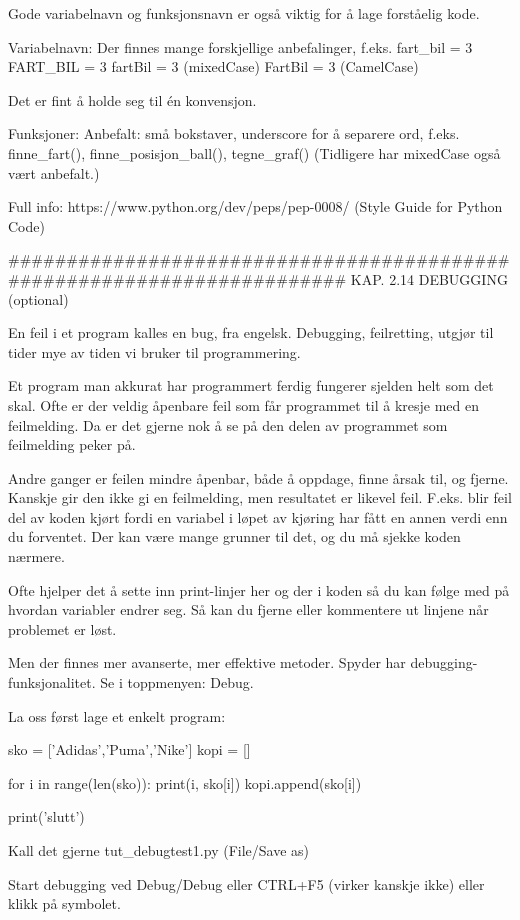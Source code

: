 Gode variabelnavn og funksjonsnavn er også viktig for å lage forståelig kode.

Variabelnavn: 
Der finnes mange forskjellige anbefalinger, f.eks. 
fart_bil = 3
FART_BIL = 3
fartBil = 3 (mixedCase)
FartBil = 3 (CamelCase)

Det er fint å holde seg til én konvensjon. 


Funksjoner:
Anbefalt: små bokstaver, underscore for å separere ord, f.eks.
finne_fart(), finne_posisjon_ball(), tegne_graf()
(Tidligere har mixedCase også vært anbefalt.) 


Full info: https://www.python.org/dev/peps/pep-0008/ (Style Guide for Python Code) 

######################################################################## 
KAP. 2.14  DEBUGGING  (optional)

En feil i et program kalles en bug, fra engelsk. 
Debugging, feilretting, utgjør til tider mye av tiden vi bruker til programmering. 

Et program man akkurat har programmert ferdig fungerer sjelden helt som det skal.
Ofte er der veldig åpenbare feil som får programmet til å kresje med en feilmelding.
Da er det gjerne nok å se på den delen av programmet som feilmelding peker på. 

Andre ganger er feilen mindre åpenbar, både å oppdage, finne årsak til, og fjerne. 
Kanskje gir den ikke gi en feilmelding, men resultatet er likevel feil. 
F.eks. blir feil del av koden kjørt fordi en variabel 
i løpet av kjøring har fått en annen verdi enn du forventet.
Der kan være mange grunner til det, og du må sjekke koden nærmere. 

Ofte hjelper det å sette inn print-linjer her og der i koden så du kan
følge med på hvordan variabler endrer seg. 
Så kan du fjerne eller kommentere ut linjene når problemet er løst.

Men der finnes mer avanserte, mer effektive metoder.  
Spyder har debugging-funksjonalitet.
Se i toppmenyen: Debug.


La oss først lage et enkelt program:

sko = ['Adidas','Puma','Nike']
kopi = []

for i in range(len(sko)): 
    print(i, sko[i])
    kopi.append(sko[i])

print('slutt')

Kall det gjerne tut_debugtest1.py (File/Save as)



Start debugging ved Debug/Debug eller CTRL+F5 (virker kanskje ikke)
eller klikk på symbolet.

